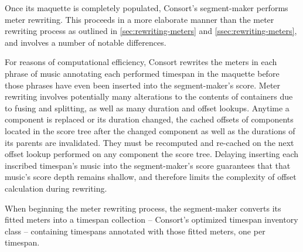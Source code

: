 Once its maquette is completely populated, Consort's segment-maker performs
meter rewriting. This proceeds in a more elaborate manner than the meter
rewriting process as outlined in \autoref{sec:rewriting-meters} and
\autoref{ssec:rewriting-meters}, and involves a number of notable differences.

For reasons of computational efficiency, Consort rewrites the meters in
each phrase of music annotating each performed timespan in the maquette before
those phrases have even been inserted into the segment-maker's score. Meter
rewriting involves potentially many alterations to the contents of containers
due to fusing and splitting, as well as many duration and offset lookups.
Anytime a component is replaced or its duration changed, the cached offsets of
components located in the score tree after the changed component as well as
the durations of its parents are invalidated. They must be recomputed and
re-cached on the next offset lookup performed on any component the score tree.
Delaying inserting each inscribed timespan's music into the segment-maker's
score guarantees that that music's score depth remains shallow, and therefore
limits the complexity of offset calculation during rewriting.

When beginning the meter rewriting process, the segment-maker converts its
fitted meters into a timespan collection -- Consort's optimized timespan
inventory class -- containing timespans annotated with those fitted meters, one
per timespan.

\begin{comment}
<abjad>
meters = metertools.MeterInventory([(3, 4), (2, 4), (6, 8), (5, 16)])
meter_timespans = consort.SegmentMaker.meters_to_timespans(meters)
print(format(meter_timespans))
</abjad>
\end{comment}


